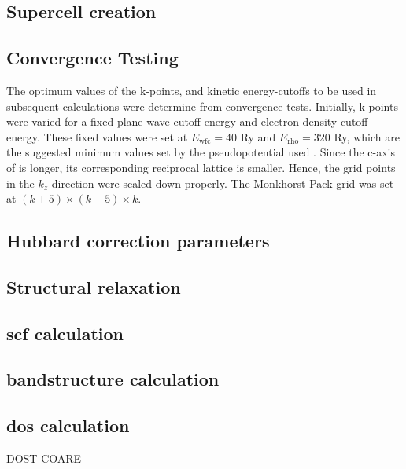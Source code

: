     \subsection{Supercell creation}


        \subsection{Convergence Testing}
        The optimum values of the k-points, and kinetic energy-cutoffs  to be used in subsequent calculations were determine from convergence tests. Initially, k-points were varied for a fixed plane wave cutoff energy and electron density cutoff energy. These fixed values were set at $E_{\text{wfc}} = 40$ Ry and $E_{\text{rho}} = 320$ Ry, which are the suggested minimum values set by the pseudopotential used \citep{Garrity2014}.  Since the c-axis of  is longer, its corresponding reciprocal lattice is smaller. Hence, the grid points in the $k_z$ direction were scaled down properly. The Monkhorst-Pack grid was set at $(k+5) \times (k +5 ) \times k$.




        \subsection{Hubbard correction parameters}
        \subsection{Structural relaxation}
        \subsection{scf calculation}
        \subsection{bandstructure calculation}
        \subsection{dos calculation}

DOST COARE